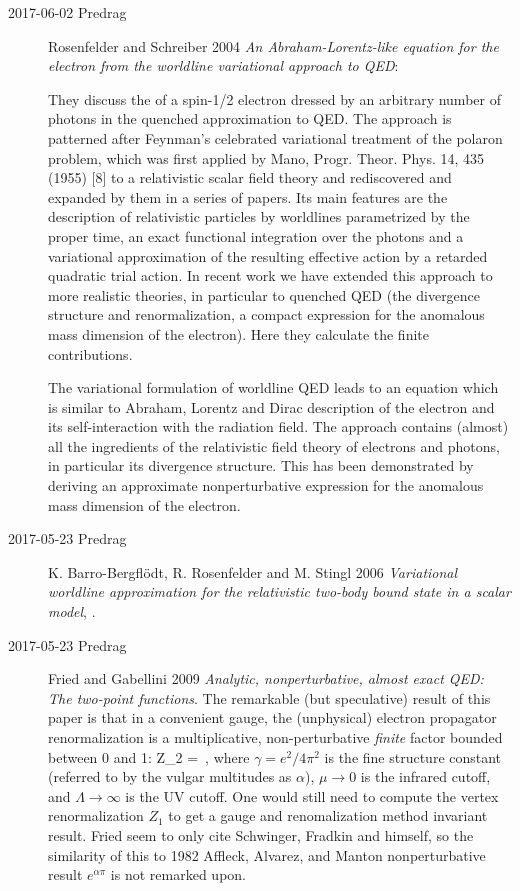 \begin{description}
\item[2017-06-02 Predrag]
Rosenfelder and Schreiber 2004
{\em An {Abraham-Lorentz-}like equation for the electron from the
worldline variational approach to {QED}}:

They discuss the of a spin-1/2 electron dressed by an arbitrary number of
photons in the quenched approximation to QED. The approach is patterned
after Feynman's celebrated variational treatment of the polaron
problem, which was first applied by Mano, Progr. Theor.
Phys. 14, 435 (1955) [8] to a relativistic  scalar  field  theory  and
rediscovered  and  expanded by them in a series of
papers. Its main features are the description of
relativistic particles by worldlines parametrized by the
proper time, an exact functional integration over the photons and a
variational approximation of the resulting effective action by a retarded
quadratic trial action. In recent work we have extended this approach to
more realistic theories, in particular to quenched QED (the
divergence structure and renormalization, a compact expression for the
anomalous mass dimension of the electron). Here they calculate the finite
contributions.

The variational formulation of worldline QED leads to an equation which
is similar to Abraham, Lorentz and Dirac description of the electron and
its self-interaction with the radiation field. The approach contains
(almost) all the ingredients of the relativistic field theory of
electrons and photons, in particular its divergence structure. This has
been demonstrated by deriving an approximate nonperturbative expression
for the anomalous mass dimension of the electron.

\item[2017-05-23 Predrag]
K. Barro-Bergfl\"odt, R. Rosenfelder and M. Stingl 2006 {\em
Variational worldline approximation for the relativistic two-body bound
state in a scalar model}, .

\item[2017-05-23 Predrag]
Fried and Gabellini 2009
{\em Analytic, nonperturbative, almost exact {QED: The} two-point functions}.
The remarkable (but speculative) result of this paper is that in a
convenient gauge, the (unphysical) electron propagator renormalization is
a multiplicative, non-perturbative \emph{finite} factor bounded between 0
and 1:
\beq
Z_2 = \exp{}
\,,
where $\gamma = e^2/4\pi^2$ is the fine structure constant (referred to
by the vulgar multitudes as $\alpha$), $\mu\to 0$ is the infrared cutoff,
and $\Lambda\to\infty$ is the UV cutoff. One would still need to compute
the vertex renormalization $Z_1$ to get a gauge and renomalization method
invariant result. Fried seem to only cite Schwinger, Fradkin and himself,
so the similarity of this to 1982 Affleck, Alvarez, and
Manton nonperturbative result $e^{\alpha\pi}$ is not
remarked upon.


\end{description}
